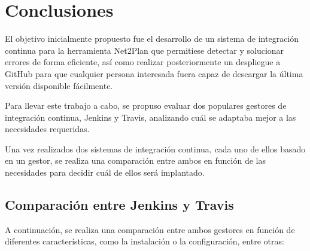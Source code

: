 \chapter{Conclusiones}
\label{conclusiones}

El objetivo inicialmente propuesto fue el desarrollo de un sistema de integración continua para la herramienta Net2Plan que permitiese detectar y solucionar errores de forma eficiente, así como realizar posteriormente un despliegue a GitHub para que cualquier persona interesada fuera capaz de descargar la última versión disponible fácilmente. 

Para llevar este trabajo a cabo, se propuso evaluar dos populares gestores de integración continua, Jenkins y Travis, analizando cuál se adaptaba mejor a las necesidades requeridas. 

Una vez realizados dos sistemas de integración continua, cada uno de ellos basado en un gestor, se realiza una comparación entre ambos en función de las necesidades para decidir cuál de ellos será implantado.

\section{Comparación entre Jenkins y Travis}

A continuación, se realiza una comparación entre ambos gestores en función de diferentes características, como la instalación o la configuración, entre otras:


